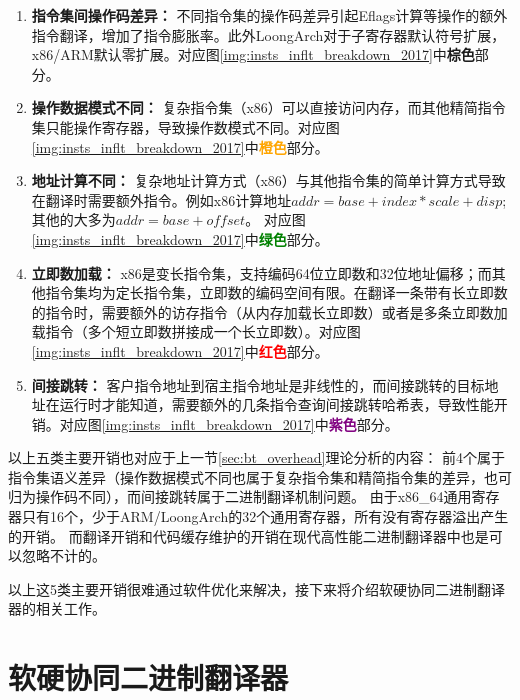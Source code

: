 \begin{enumerate}
  \item \textbf{指令集间操作码差异：} 不同指令集的操作码差异引起Eflags计算等操作的额外指令翻译，增加了指令膨胀率。此外LoongArch对于子寄存器默认符号扩展，x86/ARM默认零扩展。对应图\ref{img:insts_inflt_breakdown_2017}中\textcolor{Sepia}{\textbf{棕色}}部分。
  
  \item \textbf{操作数据模式不同：} 复杂指令集（x86）可以直接访问内存，而其他精简指令集只能操作寄存器，导致操作数模式不同。对应图\ref{img:insts_inflt_breakdown_2017}中\textcolor{orange}{\textbf{橙色}}部分。
  
  \item \textbf{地址计算不同：} 复杂地址计算方式（x86）与其他指令集的简单计算方式导致在翻译时需要额外指令。例如x86计算地址$addr = base + index * scale +disp$; 其他的大多为$addr = base + offset$。 对应图\ref{img:insts_inflt_breakdown_2017}中\textcolor{green}{\textbf{绿色}}部分。
  
  \item \textbf{立即数加载：} x86是变长指令集，支持编码64位立即数和32位地址偏移；而其他指令集均为定长指令集，立即数的编码空间有限。在翻译一条带有长立即数的指令时，需要额外的访存指令（从内存加载长立即数）或者是多条立即数加载指令（多个短立即数拼接成一个长立即数）。对应图\ref{img:insts_inflt_breakdown_2017}中\textcolor{red}{\textbf{红色}}部分。
  
  \item \textbf{间接跳转：} 客户指令地址到宿主指令地址是非线性的，而间接跳转的目标地址在运行时才能知道，需要额外的几条指令查询间接跳转哈希表，导致性能开销。对应图\ref{img:insts_inflt_breakdown_2017}中\textcolor{Purple}{\textbf{紫色}}部分。
  
\end{enumerate}

以上五类主要开销也对应于上一节\ref{sec:bt_overhead}理论分析的内容：
前4个属于指令集语义差异（操作数据模式不同也属于复杂指令集和精简指令集的差异，也可归为操作码不同），而间接跳转属于二进制翻译机制问题。
由于x86\_64通用寄存器只有16个，少于ARM/LoongArch的32个通用寄存器，所有没有寄存器溢出产生的开销。
而翻译开销和代码缓存维护的开销在现代高性能二进制翻译器中也是可以忽略不计的。

以上这5类主要开销很难通过软件优化来解决，接下来将介绍软硬协同二进制翻译器的相关工作。

\section{软硬协同二进制翻译器}

